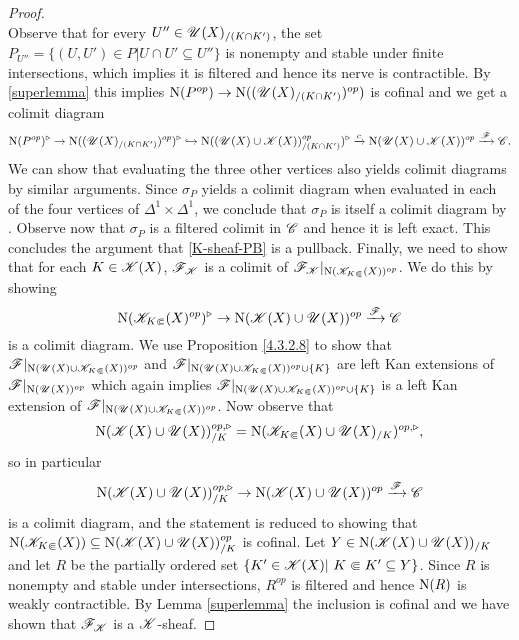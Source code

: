 \documentclass[../../thesis.tex]{subfiles}
\begin{document}
\begin{proof}
\[    \]
    Observe that for every $U'' \in \mathscr{U}(X)_{/(K\cap K')}$, the set
    $P_{U''} = \{(U,U') \in P | U\cap U' \subseteq U''\}$ is nonempty and stable under finite intersections, which implies it is filtered and hence its nerve is contractible.
    By \ref{superlemma} this implies $\mathrm{N}(P^{op}) \to \mathrm{N}((\mathscr{U}(X)_{/(K\cap K')})^{op})$ is cofinal and we get a colimit diagram
    \[
        \mathrm{N}(P^{op})^{\triangleright} \to\mathrm{N}((\mathscr{U}(X)_{/(K\cap K')})^{op})^{\triangleright} \hookrightarrow \mathrm{N}((\mathscr{U}(X) \cup \mathscr{K}(X))_{/(K\cap K')}^{op})^{\triangleright} \xrightarrow{c} \mathrm{N}(\mathscr{U}(X) \cup \mathscr{K}(X))^{op} \xrightarrow{\mathscr{F}}\mathscr{C}.
    \]
    We can show that evaluating the three other vertices also yields colimit diagrams by similar arguments.
    Since $\sigma_P$ yields a colimit diagram when evaluated in each of the four vertices of $\Delta^1 \times \Delta^1$, we conclude that $\sigma_P$ is itself a colimit diagram by \cite[Proposition 5.1.2.2]{HTT}.
    Observe now that $\sigma_P$ is a filtered colimit in $\mathscr{C}$ and hence it is left exact.
    This concludes the argument that \ref{K-sheaf-PB} is a pullback.
    Finally, we need to show that for each $K \in \mathscr{K}(X)$, $\mathscr{F}_{\mathscr{K}}$ is a colimit of $\mathscr{F}_{\mathscr{K}}|_{\mathrm{N}(\mathscr{K}_{K\Subset}(X))^{op}}$.
    We do this by showing
    \[
        \mathrm{N}(\mathscr{K}_{K\Subset}(X)^{op})^{\triangleright} \to \mathrm{N}(\mathscr{K}(X) \cup \mathscr{U}(X))^{op} \xrightarrow{\mathscr{F}} \mathscr{C}
    \]
    is a colimit diagram.
    We use Proposition \ref{4.3.2.8} to show that
    $\mathscr{F}|_{\mathrm{N}(\mathscr{U}(X) \cup \mathscr{K}_{K\Subset}(X))^{op}}$ and ${\mathscr{F}|_{\mathrm{N}(\mathscr{U}(X) \cup \mathscr{K}_{K\Subset}(X))^{op} \cup \{K\}}}$ are left Kan extensions of $\mathscr{F}|_{\mathrm{N}(\mathscr{U}(X))^{op}}$ which again implies $\mathscr{F}|_{\mathrm{N}(\mathscr{U}(X) \cup \mathscr{K}_{K\Subset}(X))^{op} \cup \{K\}}$ is a left Kan extension of $\mathscr{F}|_{\mathrm{N}(\mathscr{U}(X) \cup \mathscr{K}_{K\Subset}(X))^{op}}$.
    Now observe that
    \[
        \mathrm{N}(\mathscr{K}(X) \cup \mathscr{U}(X))^{op,\triangleright}_{/K} = \mathrm{N}(\mathscr{K}_{K\Subset}(X) \cup \mathscr{U}(X)_{/K})^{op,\triangleright},
    \]
    so in particular
    \[
        \mathrm{N}(\mathscr{K}(X) \cup \mathscr{U}(X))^{op,\triangleright}_{/K} \to \mathrm{N}(\mathscr{K}(X) \cup \mathscr{U}(X))^{op} \xrightarrow{\mathscr{F}} \mathscr{C}
    \]
    is a colimit diagram, and the statement is reduced to showing that $\mathrm{N}(\mathscr{K}_{K\Subset}(X)) \subseteq \mathrm{N}(\mathscr{K}(X) \cup \mathscr{U}(X))_{/K}^{op}$ is cofinal.
    Let $Y\in \mathrm{N}(\mathscr{K}(X) \cup \mathscr{U}(X))_{/K}$ and let $R$ be the partially ordered set $\{K' \in \K(X) | K \Subset K ' \subseteq Y\}$.
    Since $R$ is nonempty and stable under intersections, $R^{op}$ is filtered and hence $\mathrm{N}(R)$ is weakly contractible.
    By Lemma \ref{superlemma} the inclusion is cofinal and we have shown that $\mathscr{F}_{\mathscr{K}}$ is a $\mathscr{K}$-sheaf.


\end{proof}
\end{document}

